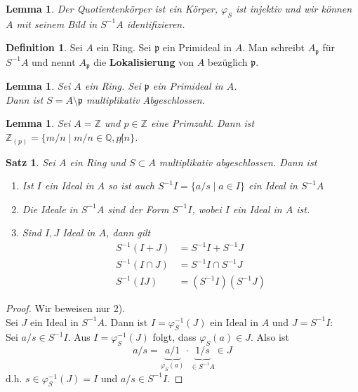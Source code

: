 \documentclass[10pt,a4paper]{article}
\newcommand{\Z}{\ensuremath{\mathbb{Z}}}
\newcommand{\Q}{\ensuremath{\mathbb{Q}}}
\theoremstyle{plain}
\newtheorem{lem}[theorem]{Lemma}
\newtheorem{satz}[theorem]{Satz}
\theoremstyle{definition}
\newtheorem{definition}[theorem]{Definition}
\theoremstyle{remark}
\begin{document}
	\begin{lem}
		Der Quotientenkörper ist ein Körper, $\varphi_S$ ist injektiv und wir können $A$ mit seinem Bild in $S^{-1}A$ identifizieren.
	\end{lem}

	\begin{definition}
		Sei $A$ ein Ring. Sei $\mathfrak p$ ein Primideal in $A$. Man schreibt $A_{\mathfrak p}$ für $S^{-1}A$ und nennt $A_{\mathfrak p}$ die \textbf{Lokalisierung} von $A$ bezüglich $\mathfrak p$.
	\end{definition}

	\begin{lem}
		Sei $A$ ein Ring. Sei $\mathfrak p$ ein Primideal in $A$.\\
		Dann ist $S=A\setminus \mathfrak p$ multiplikativ Abgeschlossen.
	\end{lem}

	\begin{lem}
		Sei $A=\Z$ und $p\in\Z$ eine Primzahl. Dann ist $\Z_{(p)}=\{m/n\mid m/n\in\Q,p\not|n\}$.
	\end{lem}

	\begin{satz}
		Sei $A$ ein Ring und $S\subset A$ multiplikativ abgeschlossen. Dann ist
		\begin{enumerate}
			\item Ist $I$ ein Ideal in $A$ so ist auch $S^{-1}I=\{a/s\mid a\in I\}$ ein Ideal in $S^{-1}A$\\
			\item Die Ideale in $S^{-1}A$ sind der Form $S^{-1}I$, wobei $I$ ein Ideal in $A$ ist.
			\item Sind $I,J$ Ideal in $A$, dann gilt
			\begin{align*}
				S^{-1}(I+J)&=S^{-1}I+S^{-1}J\\
				S^{-1}(I\cap J)&=S^{-1}I\cap S^{-1}J\\
				S^{-1}(IJ)&=(S^{-1}I)(S^{-1}J)
			\end{align*}
		\end{enumerate}
	\end{satz}
	\begin{proof}
		Wir beweisen nur 2).\\
		Sei $J$ ein Ideal in $S^{-1}A$. Dann ist $I=\varphi_S^{-1}(J)$ ein Ideal in $A$ und $J=S^{-1}I$:\\
		Sei $a/s\in S^{-1}I$. Aus $I=\varphi^{-1}_S(J)$ folgt, dass $\varphi_S(a)\in J$. Also ist
		\[a/s=\underbrace{a/1}_{\varphi_S(a)}\cdot\underbrace{1/s}_{\in S^{-1}A}\in J\]
		d.h. $s\in\varphi^{-1}_S(J)=I$ und $a/s\in S^{-1}I$.
	\end{proof}
\end{document}
